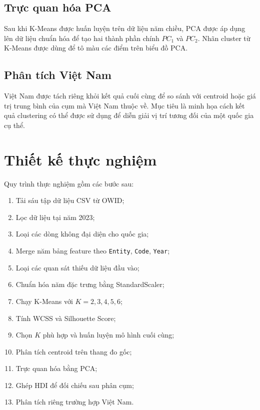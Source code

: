 \documentclass[11pt,a4paper]{article}
\begin{document}
\subsection{Trực quan hóa PCA}

Sau khi K-Means được huấn luyện trên dữ liệu năm chiều, PCA được áp dụng lên dữ liệu chuẩn hóa để tạo hai thành phần chính $PC_1$ và $PC_2$. Nhãn cluster từ K-Means được dùng để tô màu các điểm trên biểu đồ PCA.

\subsection{Phân tích Việt Nam}

Việt Nam được tách riêng khỏi kết quả cuối cùng để so sánh với centroid hoặc giá trị trung bình của cụm mà Việt Nam thuộc về. Mục tiêu là minh họa cách kết quả clustering có thể được sử dụng để diễn giải vị trí tương đối của một quốc gia cụ thể.

\section{Thiết kế thực nghiệm}

Quy trình thực nghiệm gồm các bước sau:

\begin{enumerate}
    \item Tải sáu tập dữ liệu CSV từ OWID;
    \item Lọc dữ liệu tại năm 2023;
    \item Loại các dòng không đại diện cho quốc gia;
    \item Merge năm bảng feature theo \texttt{Entity}, \texttt{Code}, \texttt{Year};
    \item Loại các quan sát thiếu dữ liệu đầu vào;
    \item Chuẩn hóa năm đặc trưng bằng StandardScaler;
    \item Chạy K-Means với $K=2,3,4,5,6$;
    \item Tính WCSS và Silhouette Score;
    \item Chọn $K$ phù hợp và huấn luyện mô hình cuối cùng;
    \item Phân tích centroid trên thang đo gốc;
    \item Trực quan hóa bằng PCA;
    \item Ghép HDI để đối chiếu sau phân cụm;
    \item Phân tích riêng trường hợp Việt Nam.
\end{enumerate}
\end{document}
